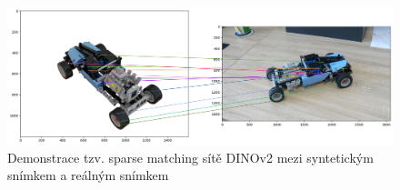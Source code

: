 \begin{figure}[H]
\centering
\includegraphics[width=1.0\textwidth,keepaspectratio]{Figures/dinov2/dinov2_synth.png}
\caption[Demonstrace tzv. sparse matching sítě DINOv2 na syntetickém snímku]{Demonstrace tzv. sparse matching sítě DINOv2 mezi syntetickým snímkem a reálným snímkem }
\label{fig:dinov2_sparse_synthetic}
\end{figure}
\endinput